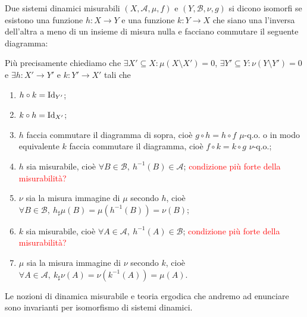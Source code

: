 \begin{definition}
    Due sistemi dinamici misurabili $ (X, \mathcal{A}, \mu, f) $ e $ (Y, \mathcal{B}, \nu, g) $ si dicono isomorfi se esistono una funzione $ h \colon X \to Y $ e una funzione $ k \colon Y \to X $ che siano una l'inversa dell'altra a meno di un insieme di misura nulla e facciano commutare il seguente diagramma:
    \begin{center}
    \end{center}
    Più precisamente chiediamo che $ \exists X' \subseteq X : \mu(X \setminus X') = 0 $, $ \exists Y' \subseteq Y : \nu(Y \setminus Y') = 0 $ e $ \exists h \colon X' \to Y' $ e $ k \colon Y' \to X' $ tali che
    \begin{enumerate}[label=(\roman*)]
        \item $ h \circ k = \mathrm{Id}_{Y'} $;
        \item $ k \circ h = \mathrm{Id}_{X'} $;
         \item $ h $ faccia commutare il diagramma di sopra, cioè $ g \circ h = h \circ f $ $ \mu $-q.o. o in modo equivalente $ k $ faccia commutare il diagramma, cioè $ f \circ k = k \circ g $ $ \nu $-q.o.;
        \item $ h $ sia misurabile, cioè $ \forall B \in \mathcal{B}, \ h^{-1}(B) \in \mathcal{A} $; \textcolor{red}{condizione più forte della misurabilità?}    
        \item $ \nu $ sia la misura immagine di $ \mu $ secondo $ h $, cioè $ {\forall B \in \mathcal{B}, \ h_\sharp \mu(B) = \mu(h^{-1}(B)) = \nu(B)} $;   
        \item $ k $ sia misurabile, cioè $ \forall A \in \mathcal{A}, \ h^{-1}(A) \in \mathcal{B} $; \textcolor{red}{condizione più forte della misurabilità?} 
        \item $ \mu $ sia la misura immagine di $ \nu $ secondo $ k $, cioè $ \forall A \in \mathcal{A}, \ k_\sharp \nu(A) = \nu(k^{-1}(A)) = \mu(A) $.
    \end{enumerate}
\end{definition}

\begin{oss}
    Le nozioni di dinamica misurabile e teoria ergodica che andremo ad enunciare sono invarianti per isomorfismo di sistemi dinamici.
\end{oss}



